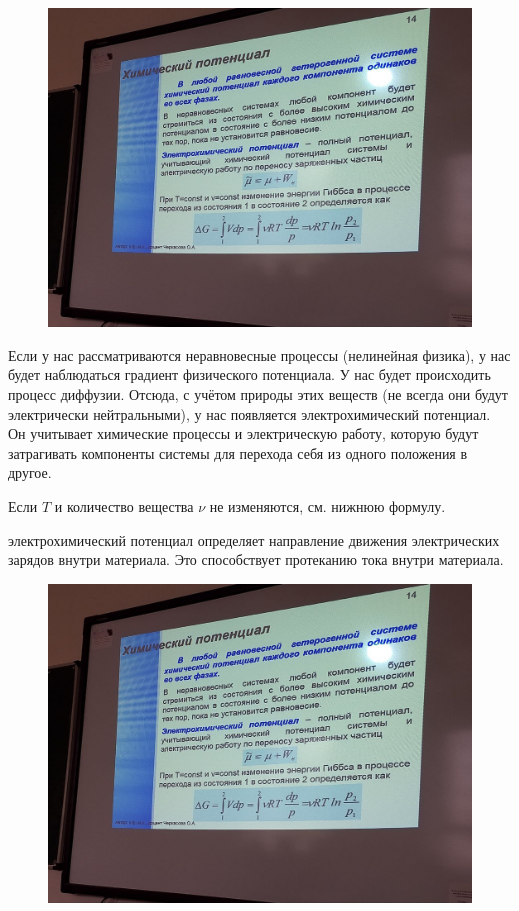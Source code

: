 \documentclass{article}
\begin{document}
\begin{figure}[H]
    \includegraphics[width=\textwidth]{13.jpg}
\end{figure}
Если у нас рассматриваются неравновесные процессы (нелинейная физика),  у нас будет наблюдаться градиент физического потенциала. У нас будет происходить процесс диффузии. Отсюда, с учётом природы этих веществ (не всегда они будут электрически нейтральными), у нас появляется электрохимический потенциал. Он учитывает химические процессы и электрическую работу, которую будут затрагивать компоненты системы для перехода себя из одного положения в другое.

Если $T$ и количество вещества $\nu$ не изменяются, см. нижнюю формулу.

электрохимический потенциал определяет направление движения электрических зарядов внутри материала. Это способствует протеканию тока внутри материала.

\begin{figure}[H]
    \includegraphics[width=\textwidth]{14.jpg}
\end{figure}
\end{document}
